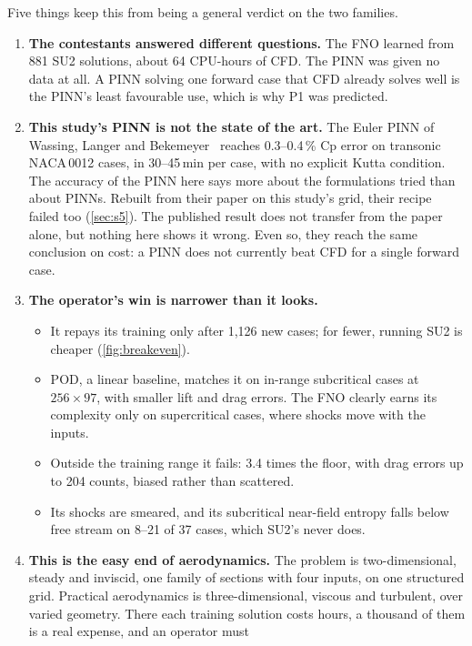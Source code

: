 \documentclass[11pt]{article}
\begin{document}
Five things keep this from being a general verdict on the two families.
\begin{enumerate}
  \item \textbf{The contestants answered different questions.} The FNO learned from 881 SU2
    solutions, about 64 CPU-hours of CFD. The PINN was given no data at all. A PINN solving one
    forward case that CFD already solves well is the PINN's least favourable use, which is why P1
    was predicted.
  \item \textbf{This study's PINN is not the state of the art.} The Euler PINN of Wassing, Langer and
    Bekemeyer~\cite{wassing2025} reaches 0.3--0.4\,\% Cp error on transonic NACA\,0012 cases, in
    30--45\,min per case, with no explicit Kutta condition. The accuracy of the PINN here says more
    about the formulations tried than about PINNs. Rebuilt from their paper on this study's grid,
    their recipe failed too (\cref{sec:s5}). The published result does not transfer from the paper
    alone, but nothing here shows it wrong. Even so, they reach the same conclusion on cost: a PINN
    does not currently beat CFD for a single forward case.
  \item \textbf{The operator's win is narrower than it looks.}
    \begin{itemize}
      \item It repays its training only after 1,126 new cases; for fewer, running SU2 is cheaper
        (\cref{fig:breakeven}).
      \item POD, a linear baseline, matches it on in-range subcritical cases at $256\times97$, with
        smaller lift and drag errors. The FNO clearly earns its complexity only on supercritical
        cases, where shocks move with the inputs.
      \item Outside the training range it fails: 3.4 times the floor, with drag errors up to 204
        counts, biased rather than scattered.
      \item Its shocks are smeared, and its subcritical near-field entropy falls below free stream on
        8--21 of 37 cases, which SU2's never does.
    \end{itemize}
  \item \textbf{This is the easy end of aerodynamics.} The problem is two-dimensional, steady and
    inviscid, one family of sections with four inputs, on one structured grid. Practical
    aerodynamics is three-dimensional, viscous and turbulent, over varied geometry. There each
    training solution costs hours, a thousand of them is a real expense, and an operator must

\end{enumerate}
\end{document}
